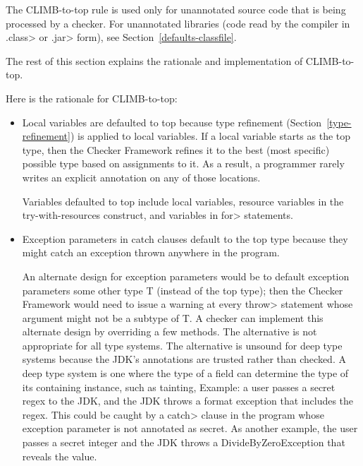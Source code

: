 The CLIMB-to-top rule is used only for unannotated source code that is
being processed by a checker.  For unannotated libraries (code read by the
compiler in \<.class> or \<.jar> form), see Section~\ref{defaults-classfile}.

The rest of this section explains the rationale and implementation of
CLIMB-to-top.

Here is the rationale for CLIMB-to-top:

\begin{itemize}
\item
Local variables are defaulted to top because type refinement
(Section~\ref{type-refinement}) is applied to local variables.  If a local
variable starts as the top type, then the Checker Framework refines it to
the best (most specific) possible type based on assignments to it.  As a
result, a programmer rarely writes an explicit annotation on any of those
locations.

Variables defaulted to top include local variables, resource variables in the
try-with-resources construct, and variables in \<for> statements.

\item
Exception parameters in catch clauses default to the top type because they
might catch an exception thrown anywhere in the program.

An alternate design for exception parameters would be to default exception
parameters some other type T (instead of the top type); then the Checker
Framework would need to issue a warning at every \<throw> statement whose
argument might not be a subtype of T\@.  A checker can implement this
alternate design by overriding a few methods.  The alternative is not
appropriate for all type systems.  The alternative is unsound for deep type
systems because the JDK's annotations are trusted rather than checked.  A
deep type system is one where the type of a field can determine the type of
its containing instance, such as tainting, Example: a user passes a secret
regex to the JDK, and the JDK throws a format exception that includes the
regex.  This could be caught by a \<catch> clause in the program whose
exception parameter is not annotated as secret.  As another example, the
user passes a secret integer and the JDK throws a DivideByZeroException
that reveals the value.



\end{itemize}
